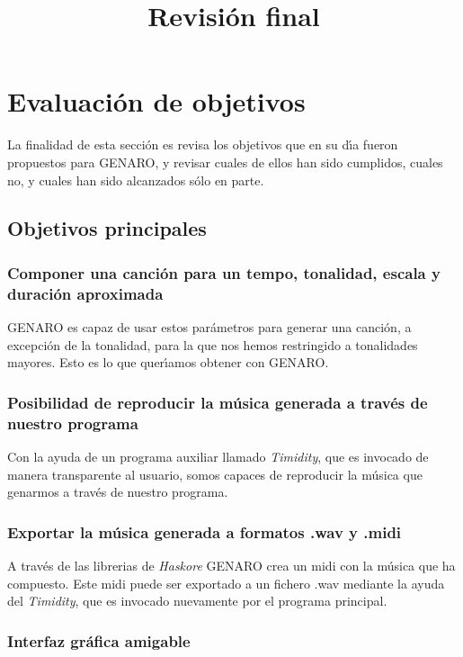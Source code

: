 \documentclass[a4paper,11pt]{article}
\title{Revisi\'on final}
\begin{document}
\maketitle
\tableofcontents
\section{Evaluaci\'on de objetivos}
La finalidad de esta secci\'on es revisa los objetivos que en su d\'\i a fueron propuestos para GENARO, y revisar cuales de ellos han sido cumplidos, cuales no, y cuales han sido alcanzados s\'olo en parte.

\subsection{Objetivos principales}

\subsubsection{Componer una canci\'on para un tempo, tonalidad, escala y duraci\'on aproximada}

GENARO es capaz de usar estos par\'ametros para generar una canci\'on, a excepci\'on de la tonalidad, para la que nos hemos restringido a tonalidades mayores. Esto es lo que quer\'\i amos obtener con GENARO.

\subsubsection{Posibilidad de reproducir la m\'usica generada a trav\'es de nuestro programa}

Con la ayuda de un programa auxiliar llamado \emph{Timidity}, que es invocado de manera transparente al usuario, somos capaces de reproducir la m\'usica que genarmos a trav\'es de nuestro programa.

\subsubsection{Exportar la m\'usica generada a formatos .wav y .midi}

A trav\'es de las librerias de \emph{Haskore} GENARO crea un midi con la m\'usica que ha compuesto. Este midi puede ser exportado a un fichero .wav mediante la ayuda del \emph{Timidity}, que es invocado nuevamente por el programa principal.

\subsubsection{Interfaz gr\'afica amigable}
\end{document}

